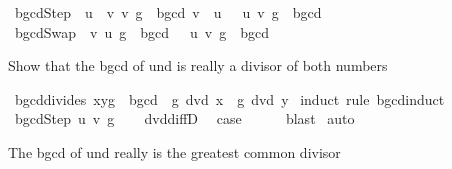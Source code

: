 \begin{isabellebody}
{\isacharbar}{\kern0pt}\ bgcdStep{\isacharcolon}{\kern0pt}\ {\isachardoublequoteopen}{\isasymlbrakk}\ {\isacharparenleft}{\kern0pt}u\ {\isacharminus}{\kern0pt}\ v{\isacharcomma}{\kern0pt}\ v{\isacharcomma}{\kern0pt}\ g{\isacharparenright}{\kern0pt}\ {\isasymin}\ bgcd{\isacharsemicolon}{\kern0pt}\ v\ {\isasymle}\ u\ {\isasymrbrakk}\ {\isasymLongrightarrow}\ {\isacharparenleft}{\kern0pt}u{\isacharcomma}{\kern0pt}\ v{\isacharcomma}{\kern0pt}\ g{\isacharparenright}{\kern0pt}\ {\isasymin}\ bgcd{\isachardoublequoteclose}\isanewline
{\isacharbar}{\kern0pt}\ bgcdSwap{\isacharcolon}{\kern0pt}\ {\isachardoublequoteopen}{\isasymlbrakk}\ {\isacharparenleft}{\kern0pt}v{\isacharcomma}{\kern0pt}\ u{\isacharcomma}{\kern0pt}\ g{\isacharparenright}{\kern0pt}\ {\isasymin}\ bgcd\ {\isasymrbrakk}\ {\isasymLongrightarrow}\ {\isacharparenleft}{\kern0pt}u{\isacharcomma}{\kern0pt}\ v{\isacharcomma}{\kern0pt}\ g{\isacharparenright}{\kern0pt}\ {\isasymin}\ bgcd{\isachardoublequoteclose}%
\isadelimdocument
%
\endisadelimdocument
%
\isatagdocument
%
\isamarkuptrue%
%
\endisatagdocument
{\isafolddocument}%
%
\isadelimdocument
%
\endisadelimdocument
%
\begin{isamarkuptext}%
Show that the bgcd of  und  is
really a divisor of both numbers%
\end{isamarkuptext}\isamarkuptrue%
\isamarkupfalse%
\ bgcd{\isacharunderscore}{\kern0pt}divides{\isacharcolon}{\kern0pt}\ {\isachardoublequoteopen}{\isacharparenleft}{\kern0pt}x{\isacharcomma}{\kern0pt}y{\isacharcomma}{\kern0pt}g{\isacharparenright}{\kern0pt}\ {\isasymin}\ bgcd\ {\isasymLongrightarrow}\ g\ dvd\ x\ {\isasymand}\ g\ dvd\ y{\isachardoublequoteclose}\isanewline
%
\isadelimproof
%
\endisadelimproof
%
\isatagproof
{}\isamarkupfalse%
\ {\isacharparenleft}{\kern0pt}induct\ rule{\isacharcolon}{\kern0pt}\ bgcd{\isachardot}{\kern0pt}induct{\isacharparenright}{\kern0pt}\isanewline
\ \ \isamarkupfalse%
\ {\isacharparenleft}{\kern0pt}bgcdStep\ u\ v\ g{\isacharparenright}{\kern0pt}\isanewline
\ \ \isamarkupfalse%
\ dvd{\isacharunderscore}{\kern0pt}diffD\ \isamarkupfalse%
\ {\isacharquery}{\kern0pt}case\isanewline
\ \ \ \ \isamarkupfalse%
\ blast\isanewline
{}\isamarkupfalse%
\ auto%
\endisatagproof
{\isafoldproof}%
%
\isadelimproof
%
\endisadelimproof
%
\begin{isamarkuptext}%
The bgcd of  und  really is the greatest common divisor

\end{isamarkuptext}
\end{isabellebody}
